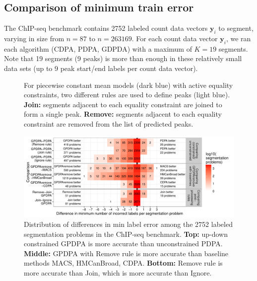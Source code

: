 \documentclass[twoside,11pt]{article}
\begin{document}
\subsection{Comparison of minimum train error}

The ChIP-seq benchmark contains 2752 labeled count data vectors
$\mathbf y_i$ to segment, varying in size from $n=87$ to
$n=263169$. For each count data vector $\mathbf y_i$, we ran each
algorithm (CDPA, PDPA, GDPDA) with a maximum of $K=19$ segments. Note
that 19 segments (9 peaks) is more than enough in these relatively
small data sets (up to 9 peak start/end labels per count data vector).

%   

\begin{figure} 
  \centering
  
  \vspace{-1cm} 
  \caption{For piecewise constant mean models (dark blue) with
    active equality constraints, two different rules are used to define
    peaks (light blue). \textbf{Join:} segments adjacent to each equality
    constraint are joined to form a single peak. \textbf{Remove:}
    segments adjacent to each equality constraint are removed from the
    list of predicted peaks. }
  \label{fig:infeasible-error}
\end{figure}

\begin{figure}
  \centering
  \includegraphics[width=\textwidth]{figure-PDPA-infeasible-error-compare}
  \vspace{-1cm}
  \caption{Distribution of differences in min label error among the
    2752 labeled segmentation problems in the ChIP-seq benchmark. 
    \textbf{Top:} up-down constrained GPDPA is more accurate than
    unconstrained PDPA. \textbf{Middle:} GPDPA with Remove
    rule is more accurate than baseline methods MACS, HMCanBroad,
    CDPA. \textbf{Bottom:} Remove rule is more accurate than 
    Join, which is more accurate than Ignore.}
  \label{fig:PDPA-infeasible-error-compare}
\end{figure} 
\end{document}

